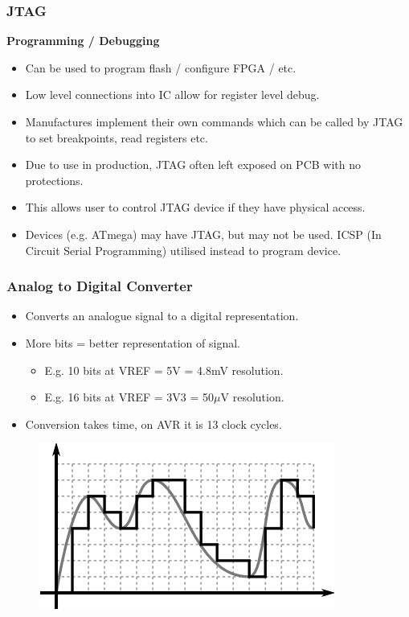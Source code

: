 \documentclass[t]{beamer}
\begin{document}
\begin{frame}[t]
\end{frame}


\begin{frame}[t]
\frametitle{JTAG}
\textbf{Programming / Debugging}
\begin{itemize}
	\item Can be used to program flash / configure FPGA / etc.
	\item Low level connections into IC allow for register level debug.
	\item Manufactures implement their own commands which can be called by JTAG to set breakpoints, read registers etc.
	\item Due to use in production, JTAG often left exposed on PCB with no protections. 
	\item This allows user to control JTAG device if they have physical access. 
	\item Devices (e.g. ATmega) may have JTAG, but may not be used. ICSP (In Circuit Serial Programming) utilised instead to program device. 
\end{itemize}

\end{frame}


\begin{frame}[t]
\frametitle{Analog to Digital Converter}
\begin{itemize}
	\item Converts an analogue signal to a digital representation. 
	\item More bits = better representation of signal. 
	\begin{itemize}
		\item E.g. 10 bits at VREF = 5V = 4.8mV resolution.
		\item E.g. 16 bits at VREF = 3V3 = 50$\mu$V resolution. 
	\end{itemize}
	\item Conversion takes time, on AVR it is 13 clock cycles. 
\end{itemize}

\begin{figure}
	\includegraphics[width=0.6\linewidth]{analogVSdigital.png}
\end{figure}
\end{frame}
\end{document}
